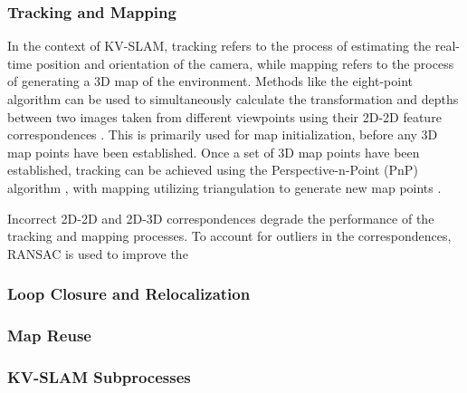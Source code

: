 \subsubsection{Tracking and Mapping}

In the context of KV-SLAM, tracking refers to the process of estimating the real-time position and orientation of the camera, while mapping refers to the process of generating a 3D map of the environment. Methods like the eight-point algorithm can be used to simultaneously calculate the transformation and depths between two images taken from different viewpoints using their 2D-2D feature correspondences \cite{longuet-higginsComputerAlgorithmReconstructing1981}\cite{hartleyDefenseEightpointAlgorithm1997}. This is primarily used for map initialization, before any 3D map points have been established. Once a set of 3D map points have been established, tracking can be achieved using the Perspective-n-Point (PnP) algorithm \cite{fischlerRandomSampleConsensus1981}, with mapping utilizing triangulation to generate new map points \cite{davisonRealtimeSimultaneousLocalisation2003}.

Incorrect 2D-2D and 2D-3D correspondences degrade the performance of the tracking and mapping processes. To account for outliers in the correspondences, RANSAC is used to improve the 

\subsubsection{Loop Closure and Relocalization}

\subsubsection{Map Reuse}

\subsubsection{KV-SLAM Subprocesses}